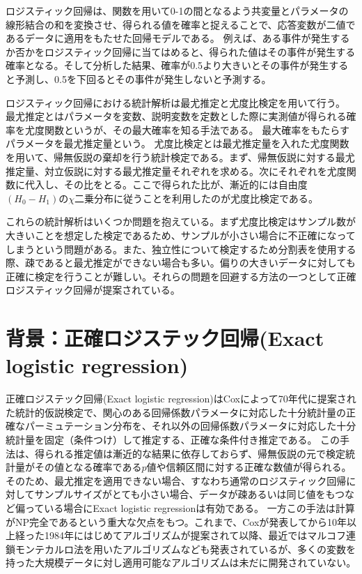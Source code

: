 \documentclass[12pt, dvipdfmx]{jmaster}
\theoremstyle{definition}
\begin{document}
ロジスティック回帰は、関数を用いて0-1の間となるよう共変量とパラメータの線形結合の和を変換させ、得られる値を確率と捉えることで、応答変数が二値であるデータに適用をもたせた回帰モデルである。
例えば、ある事件が発生するか否かをロジスティック回帰に当てはめると、得られた値はその事件が発生する確率となる。そして分析した結果、確率が0.5より大きいとその事件が発生すると予測し、0.5を下回るとその事件が発生しないと予測する。

ロジスティック回帰における統計解析は最尤推定と尤度比検定を用いて行う。
最尤推定とはパラメータを変数、説明変数を定数とした際に実測値が得られる確率を尤度関数というが、その最大確率を知る手法である。
最大確率をもたらすパラメータを最尤推定量という。
尤度比検定とは最尤推定量を入れた尤度関数を用いて、帰無仮説の棄却を行う統計検定である。まず、帰無仮説に対する最尤推定量、対立仮説に対する最尤推定量それぞれを求める。次にそれぞれを尤度関数に代入し、その比をとる。ここで得られた比が、漸近的には自由度$(H_0 - H_1)$の$χ$二乗分布に従うことを利用したのが尤度比検定である\cite{kubo}。

これらの統計解析はいくつか問題を抱えている。まず尤度比検定はサンプル数が大きいことを想定した検定であるため、サンプルが小さい場合に不正確になってしまうという問題がある。また、独立性について検定するため分割表を使用する際、疎であると最尤推定ができない場合も多い。偏りの大きいデータに対しても正確に検定を行うことが難しい\cite{10.2307/2288420, 10.2307/2289388, mehta1998exact, mehta1995exact,10.1198/00031300283}。それらの問題を回避する方法の一つとして正確ロジスティック回帰が提案されている。

\section{背景：正確ロジステック回帰(Exact logistic regression)}
正確ロジステック回帰(Exact logistic regression)はCoxによって70年代に提案された統計的仮説検定で、関心のある回帰係数パラメータに対応した十分統計量の正確なパーミュテーション分布を、それ以外の回帰係数パラメータに対応した十分統計量を固定（条件つけ）して推定する、正確な条件付き推定である\cite{cox1970analysis}。
この手法は、得られる推定値は漸近的な結果に依存しておらず、帰無仮説の元で検定統計量がその値となる確率である$p$値や信頼区間に対する正確な数値が得られる。
そのため、最尤推定を適用できない場合、すなわち通常のロジスティック回帰に対してサンプルサイズがとても小さい場合、データが疎あるいは同じ値をもつなど偏っている場合にExact logistic regressionは有効である\cite{10.2307/2288420, 10.2307/2289388, mehta1998exact, mehta1995exact}。
一方この手法は計算がNP完全であるという重大な欠点をもつ。これまで、Coxが発表してから10年以上経った1984年にはじめてアルゴリズムが提案されて以降\cite{10.2307/2288420}、最近ではマルコフ連鎖モンテカルロ法を用いたアルゴリズムなども発表されているが\cite{mehta2000efficient}、多くの変数を持った大規模データに対し適用可能なアルゴリズムは未だに開発されていない。
\end{document}
